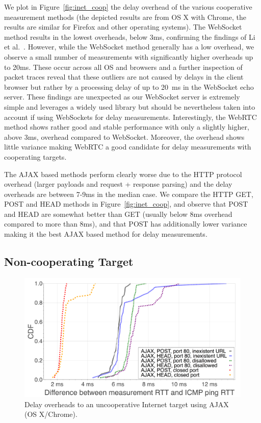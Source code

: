 \documentclass[12pt,twoside]{book}
\begin{document}
We plot in Figure~\ref{fig:inet_coop} the delay overhead of the various cooperative measurement methods (the depicted results are from OS X with Chrome, the results are similar for Firefox and other operating systems). The WebSocket method results in the lowest overheads, below 3ms, confirming the findings of Li et al.~\cite{li:imc2013}. However, while the WebSocket method generally has a low overhead, we observe a small number of measurements with significantly higher overheads up to 20ms. These occur across all OS and browsers and a further inspection of packet traces reveal that these outliers are not caused by delays in the client browser but rather by a processing delay of up to 20~ms in the WebSocket echo server. These findings are unexpected as our WebSocket server is extremely simple and leverages a widely used library but should be nevertheless taken into account if using WebSockets for delay measurements. Interestingly, the WebRTC method shows rather good and stable performance with only a slightly higher, above 3ms, overhead compared to WebSocket. Moreover, the overhead shows little variance making WebRTC a good candidate for delay measurements with cooperating targets.

The AJAX based methods perform clearly worse due to the HTTP protocol overhead (larger payloads and request + response parsing) and the delay overheads are between 7-9ms in the median case. We compare the HTTP GET, POST and HEAD methods in Figure~\ref{fig:inet_coop}, and observe that POST and HEAD are somewhat better than GET (usually below 8ms overhead compared to more than 8ms), and that POST has additionally lower variance making it the best AJAX based method for delay measurements. 

\subsection{Non-cooperating Target}

\begin{figure}[h]
\includegraphics[width=\columnwidth]{figures/inet-non-coop-new}
\caption{Delay overheads to an uncooperative Internet target using AJAX (OS X/Chrome).}
\label{fig:inet_non_coop_new}
\end{figure}
\vspace{-2mm}
\end{document}
